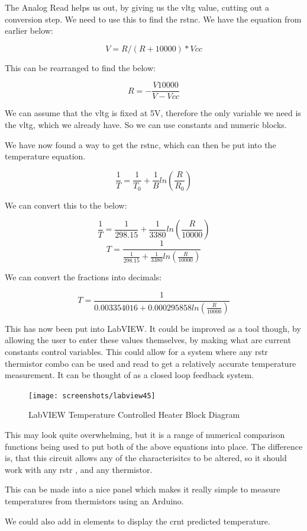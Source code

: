 \documentclass[a4paper,11pt]{report}
\begin{document}
The Analog Read helps us out, by giving us the \gls{vltg} value, cutting out a conversion step. We need to use this to find the \gls{rstnc}. We have the equation from earlier below:

\[V = R / (R + 10000) * Vcc\]

This can be rearranged to find the below:

\[R=-\frac{V10000}{V-Vcc}\]

We can assume that the \gls{vltg} is fixed at 5V, therefore the only variable we need is the \gls{vltg}, which we already have. So we can use constants and numeric blocks.

We have now found a way to get the \gls{rstnc}, which can then be put into the temperature equation.

\[\frac{1}{T} = \frac{1}{T_0} + \frac{1}{B}ln(\frac{R}{R_0})\]

We can convert this to the below:

\[\frac{1}{T} = \frac{1}{298.15} + \frac{1}{3380}ln(\frac{R}{10000})\]
\[T = \frac{1}{\frac{1}{298.15} + \frac{1}{3380}ln(\frac{R}{10000})}\]

We can convert the fractions into decimals:

\[T = \frac{1}{0.003354016 + 0.000295858ln(\frac{R}{10000})}\]

This has now been put into LabVIEW. It could be improved as a tool though, by allowing the user to enter these values themselves, by making what are current constants control variables. This could allow for a system where any \gls{rstr} thermistor combo can be used and read to get a relatively accurate temperature measurement. It can be thought of as a closed loop feedback system.

\begin{figure}[H]
\centering
\texttt{[image: screenshots/labview45]}
\caption{LabVIEW Temperature Controlled Heater Block Diagram}
\end{figure}

This may look quite overwhelming, but it is a range of numerical comparison functions being used to put both of the above equations into place. The difference is, that this circuit allows any of the characterisitcs to be altered, so it should work with any \gls{rstr} , and any thermistor.

This can be made into a nice panel which makes it really simple to measure temperatures from thermistors using an Arduino.

We could also add in elements to display the \gls{crnt} predicted temperature.
\end{document}
